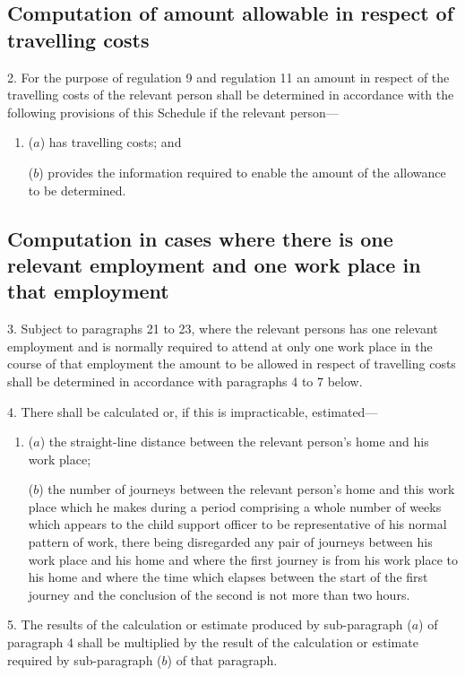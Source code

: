 \documentclass[a4paper]{article}
\begin{document}
\subsection*{Computation of amount allowable in respect of travelling costs}

2.  For the purpose of regulation 9 and regulation 11 an amount in respect of the travelling costs of the relevant person shall be determined in accordance with the following provisions of this Schedule if the relevant person—
\begin{enumerate}\item[]
($a$) has travelling costs; and

($b$) provides the information required to enable the amount of the allowance to be determined.
\end{enumerate}

\subsection*{Computation in cases where there is one relevant employment and one work place in that employment}

3.  Subject to paragraphs 21 to 23, where the relevant persons has one relevant employment and is normally required to attend at only one work place in the course of that employment the amount to be allowed in respect of travelling costs shall be determined in accordance with paragraphs 4 to 7 below.

\medskip

4.  There shall be calculated or, if this is impracticable, estimated—
\begin{enumerate}\item[]
($a$) the straight-line distance between the relevant person’s home and his work place;

($b$) the number of journeys between the relevant person’s home and this work place which he makes during a period comprising a whole number of weeks which appears to the child support officer to be representative of his normal pattern of work, there being disregarded any pair of journeys between his work place and his home and where the first journey is from his work place to his home and where the time which elapses between the start of the first journey and the conclusion of the second is not more than two hours.
\end{enumerate}

\medskip

5.  The results of the calculation or estimate produced by sub-paragraph ($a$) of paragraph 4 shall be multiplied by the result of the calculation or estimate required by sub-paragraph ($b$) of that paragraph.
\end{document}
